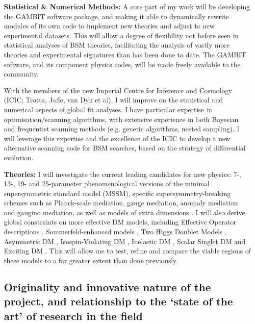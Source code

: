 \documentclass[a4paper,11pt]{article}
\begin{document}
\textbf{Statistical \& Numerical Methods:}
A core part of my work will be developing the GAMBIT software package, and making it able to dynamically rewrite modules of its own code to implement new theories and adjust to new experimental datasets.  This will allow a degree of flexibility not before seen in statistical analyses of BSM theories, facilitating the analysis of vastly more theories and experimental signatures than has been done to date.  The GAMBIT software, and its component physics codes, will be made freely available to the community.

With the members of the new Imperial Centre for Inference and Cosmology (ICIC; Trotta, Jaffe, van Dyk et al), I will improve on the statistical and numerical aspects of global fit analyses.  I have particular expertise in optimisation/scanning algorithms, with extensive experience in both Bayesian and frequentist scanning methods (e.g. genetic algorithms, nested sampling).  I will leverage this expertise and the excellence of the ICIC to develop a new alternative scanning code for BSM searches, based on the strategy of differential evolution.

\textbf{Theories:}
I will investigate the current leading candidates for new physics: 7-, 13-, 19- and 25-parameter phenomenological versions of the minimal supersymmetric standard model (MSSM), specific supersymmetry-breaking schemes such as Planck-scale mediation, gauge mediation, anomaly mediation and gaugino mediation, as well as models of extra dimensions \cite{Martin,BaerTata,ServantTait}.  I will also derive global constraints on more effective DM models, including Effective Operator descriptions \cite{Goodman10,Bai10,Fox12b}, Sommerfeld-enhanced models \cite{AHDM}, Two Higgs Doublet Models \cite{2HDM}, Asymmetric DM \cite{Shelton10,Falkowski11,Frandsen11}, Isospin-Violating DM \cite{Feng11}, Inelastic DM \cite{TuckerSmithWeiner05,SmithWeiner01}, Scalar Singlet DM \cite{SilveiraZee,Cline13b} and Exciting DM \cite{FinkbeinerWeiner07}.  This will allow me to test, refine and compare the viable regions of these models to a far greater extent than done previously.

\subsection{Originality and innovative nature of the project, and relationship to the `state of the art' of research in the field}
\end{document}
